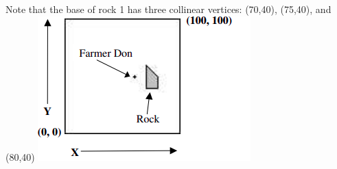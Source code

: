 Note that the base of rock 1 has three collinear vertices: (70,40), (75,40), and (80,40)
\includegraphics{1.png}
